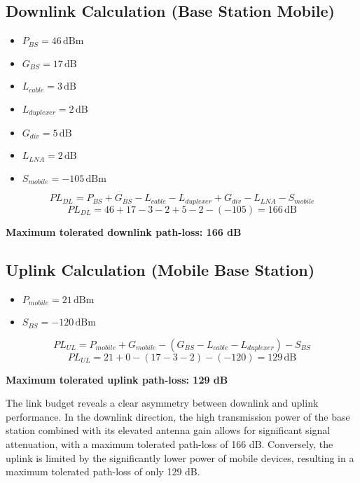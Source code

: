 \documentclass[a4paper,12pt]{article}
\begin{document}
\subsection*{Downlink Calculation (Base Station \textrightarrow{} Mobile)}

\begin{itemize}
    \item $P_{BS} = 46\,\text{dBm}$
    \item $G_{BS} = 17\,\text{dB}$
    \item $L_{cable} = 3\,\text{dB}$
    \item $L_{duplexer} = 2\,\text{dB}$
    \item $G_{div} = 5\,\text{dB}$
    \item $L_{LNA} = 2\,\text{dB}$
    \item $S_{mobile} = -105\,\text{dBm}$
\end{itemize}

\[PL_{DL} = P_{BS} + G_{BS} - L_{cable} - L_{duplexer} + G_{div} - L_{LNA} - S_{mobile}\]
\[PL_{DL} = 46 + 17 - 3 - 2 + 5 - 2 - (-105) = 166\,\text{dB}\]

\textbf{Maximum tolerated downlink path-loss: 166 dB}

\subsection*{Uplink Calculation (Mobile \textrightarrow{} Base Station)}

\begin{itemize}
    \item $P_{mobile} = 21\,\text{dBm}$
    \item $S_{BS} = -120\,\text{dBm}$
\end{itemize}

\[PL_{UL} = P_{mobile} + G_{mobile} - (G_{BS} - L_{cable} - L_{duplexer}) - S_{BS}\]
\[PL_{UL} = 21 + 0 - (17 - 3 - 2) - (-120) = 129\,\text{dB}\]

\textbf{Maximum tolerated uplink path-loss: 129 dB}

\bigskip

The link budget reveals a clear asymmetry between downlink and uplink performance. In the downlink direction, the high transmission power of the base station combined with its elevated antenna gain allows for significant signal attenuation, with a maximum tolerated path-loss of 166 dB. Conversely, the uplink is limited by the significantly lower power of mobile devices, resulting in a maximum tolerated path-loss of only 129 dB.
\end{document}
